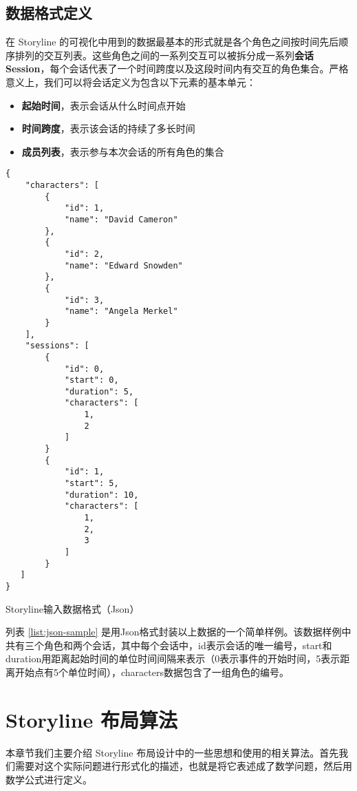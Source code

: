 \subsection{数据格式定义}
在 Storyline 的可视化中用到的数据最基本的形式就是各个角色之间按时间先后顺序排列的交互列表。这些角色之间的一系列交互可以被拆分成一系列\textbf{会话 Session}，每个会话代表了一个时间跨度以及这段时间内有交互的角色集合。严格意义上，我们可以将会话定义为包含以下元素的基本单元：
\begin{itemize}
\item \textbf{起始时间}，表示会话从什么时间点开始
\item \textbf{时间跨度}，表示该会话的持续了多长时间
\item \textbf{成员列表}，表示参与本次会话的所有角色的集合
\end{itemize}
\begin{listing}[!htb]
\linespread{0.6}
\begin{verbatim}
{
    "characters": [
        {
            "id": 1,
            "name": "David Cameron"
        },
        {
            "id": 2,
            "name": "Edward Snowden"
        },
        {
            "id": 3,
            "name": "Angela Merkel"
        }
    ],
    "sessions": [
        {
            "id": 0,
            "start": 0,
            "duration": 5,
            "characters": [
                1,
                2
            ]
        }
        {
            "id": 1,
            "start": 5,
            "duration": 10,
            "characters": [
                1,
                2,
                3
            ]
        }
   ]
}
\end{verbatim}
\caption{Storyline输入数据格式（Json）} 
\label{list:json-sample}
\end{listing}
列表 \ref{list:json-sample} 是用Json格式封装以上数据的一个简单样例。该数据样例中共有三个角色和两个会话，其中每个会话中，id表示会话的唯一编号，start和duration用距离起始时间的单位时间间隔来表示（0表示事件的开始时间，5表示距离开始点有5个单位时间），characters数据包含了一组角色的编号。

\section{Storyline 布局算法}
本章节我们主要介绍 Storyline 布局设计中的一些思想和使用的相关算法。首先我们需要对这个实际问题进行形式化的描述，也就是将它表述成了数学问题，然后用数学公式进行定义。
